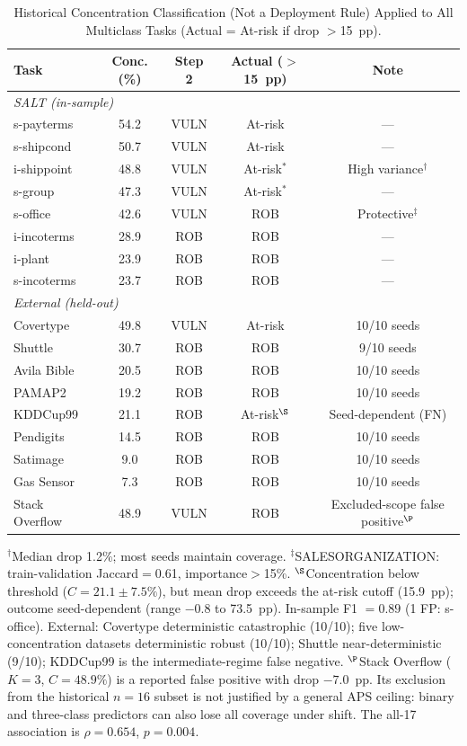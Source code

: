 \documentclass[accepted]{uai2026} %
\begin{document}
\begin{table}[htbp]
\centering
\caption{Historical Concentration Classification (Not a Deployment Rule) Applied to All Multiclass Tasks (Actual = At-risk if drop $>$15~pp).}\label{tab:framework_validation}
\small
\begin{tabular}{@{}lcccc@{}}
\toprule
Task & Conc. (\%) & Step 2 & Actual ($>$15~pp) & Note \\
\midrule
\multicolumn{5}{l}{\textit{SALT (in-sample)}} \\
s-payterms & 54.2 & VULN & At-risk & --- \\
s-shipcond & 50.7 & VULN & At-risk & --- \\
i-shippoint & 48.8 & VULN & At-risk$^*$ & High variance$^\dagger$ \\
s-group & 47.3 & VULN & At-risk$^*$ & --- \\
s-office & 42.6 & VULN & ROB & Protective$^\ddagger$ \\
i-incoterms & 28.9 & ROB & ROB & --- \\
i-plant & 23.9 & ROB & ROB & --- \\
s-incoterms & 23.7 & ROB & ROB & --- \\
\midrule
\multicolumn{5}{l}{\textit{External (held-out)}} \\
Covertype & 49.8 & VULN & At-risk & 10/10 seeds \\
Shuttle & 30.7 & ROB & ROB & 9/10 seeds \\
Avila Bible & 20.5 & ROB & ROB & 10/10 seeds \\
PAMAP2 & 19.2 & ROB & ROB & 10/10 seeds \\
KDDCup99 & 21.1 & ROB & At-risk$^\S$ & Seed-dependent (FN) \\
Pendigits & 14.5 & ROB & ROB & 10/10 seeds \\
Satimage & 9.0 & ROB & ROB & 10/10 seeds \\
Gas Sensor & 7.3 & ROB & ROB & 10/10 seeds \\
Stack Overflow & 48.9 & VULN & ROB & Excluded-scope false positive$^\P$ \\
\bottomrule
\end{tabular}


\raggedright
\footnotesize
$^\dagger$Median drop 1.2\%; most seeds maintain coverage.
$^\ddagger$SALESORGANIZATION: train-validation Jaccard$=$0.61, importance$>$15\%.
$^\S$Concentration below threshold ($C=21.1\pm7.5\%$), but mean drop exceeds the at-risk cutoff (15.9~pp); outcome seed-dependent (range $-$0.8 to 73.5~pp).
In-sample F1 $= 0.89$ (1 FP: s-office). External: Covertype deterministic catastrophic (10/10); five low-concentration datasets deterministic robust (10/10); Shuttle near-deterministic (9/10); KDDCup99 is the intermediate-regime false negative.
$^\P$Stack Overflow ($K=3$, $C=48.9\%$) is a reported false positive with drop $-7.0$~pp. Its exclusion from the historical $n=16$ subset is not justified by a general APS ceiling: binary and three-class predictors can also lose all coverage under shift. The all-17 association is $\rho=0.654$, $p=0.004$.
\end{table}
\end{document}
